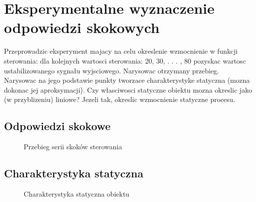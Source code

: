 \section{Eksperymentalne wyznaczenie odpowiedzi skokowych}
\label{lab:zad2}

Przeprowadzic eksperyment majacy na celu okreslenie wzmocnienie w funkcji sterowania:
dla kolejnych wartosci sterowania: 20, 30, . . . , 80 pozyskac wartosc ustabilizowanego
sygnału wyjsciowego. Narysowac otrzymany przebieg. Narysowac na jego
podstawie punkty tworzace charakterystyke statyczna (mozna dokonac jej aproksymacji).
Czy własciwosci statyczne obiektu mozna okreslic jako (w przyblizeniu) liniowe?
Jezeli tak, okreslic wzmocnienie statyczne procesu.


\subsection{Odpowiedzi skokowe}
\label{lab:zad2:odpSkok}

\begin{figure}[H] 
   \centering
   
   \caption{Przebieg serii skoków sterowania}
   \label{lab:zad2:zad2odpSkok:figure}
\end{figure}

\newpage

\subsection{Charakterystyka statyczna}
\label{lab:zad2:charStat}

\begin{figure}[H] 
    \centering
    
    \caption{Charakterystyka statyczna obiektu}
    \label{lab:zad2:zad2charStat:figure}
 \end{figure}

\newpage
